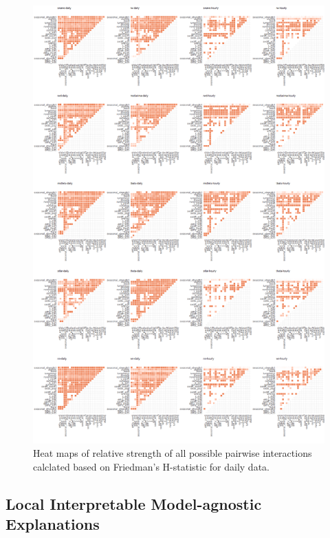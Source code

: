 \documentclass[11pt,a4paper,]{article}
\begin{document}
\begin{figure}
\centering
\includegraphics{figures/friedmandailyhourly-1.png}
\caption{\label{fig:friedmandailyhourly}Heat maps of relative strength of
all possible pairwise interactions calclated based on Friedman's
H-statistic for daily data.}
\end{figure}

\newpage

\subsection{Local Interpretable Model-agnostic
Explanations}\label{local-interpretable-model-agnostic-explanations}
\end{document}
